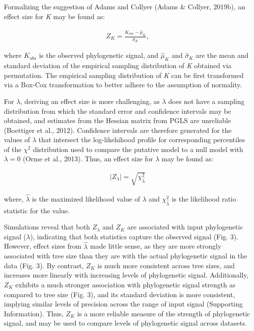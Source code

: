 \documentclass[
]{article}
\begin{document}
Formalizing the suggestion of Adams and Collyer (Adams \& Collyer,
2019b), an effect size for \emph{K} may be found as:

\begin{align}
    Z_K=\frac{K_{obs}-\hat\mu_{K}}{\hat\sigma_{K}},
\end{align}

where \(K_{obs}\) is the observed phylogenetic signal, and \(\hat\mu_K\)
and \(\hat\sigma_K\) are the mean and standard deviation of the
empirical sampling distribution of \emph{K} obtained via permutation.
The empirical sampling distribution of \emph{K} can be first transformed
via a Box-Cox transformation to better adhere to the assumption of
normality. \hfill\break

For \(\lambda\), deriving an effect size is more challenging, as
\(\lambda\) does not have a sampling distribution from which the
standard error and confidence intervals may be obtained, and estimates
from the Hessian matrix from PGLS are unreliable (Boettiger et al.,
2012). Confidence intervals are therefore generated for the values of
\(\lambda\) that intersect the log-likehihood profile for corresponding
percentiles of the \(\chi^2\) distribution used to compare the putative
model to a null model with \(\lambda = 0\) (Orme et al., 2013). Thus, an
effect size for \(\lambda\) may be found as:

\begin{align}
   \lvert Z_{\lambda} \rvert = \sqrt{\chi^2_{\hat{\lambda}}}
\end{align}

where, \(\hat{\lambda}\) is the maximized likelihood value of
\(\lambda\) and \(\chi^{2}_{\hat{\lambda}}\) is the likelihood ratio
statistic for the value. \hfill\break

Simulations reveal that both \(Z_{\lambda}\) and \(Z_K\) are associated
with input phylogenetic signal (\(\lambda\)), indicating that both
statistics capture the observed signal (Fig. 3). However, effect sizes
from \(\hat{\lambda}\) made little sense, as they are more strongly
associated with tree size than they are with the actual phylogenetic
signal in the data (Fig. 3). By contrast, \(Z_K\) is much more
consistent across tree sizes, and increases more linearly with
increasing levels of phylogenetic signal. Additionally, \(Z_K\) exhibits
a much stronger association with phylogenetic signal strength as
compared to tree size (Fig. 3), and its standard deviation is more
consistent, implying similar levels of precision across the range of
input signal (Supporting Information). Thus, \(Z_K\) is a more reliable
measure of the strength of phylogenetic signal, and may be used to
compare levels of phylogenetic signal across datasets.
\end{document}
